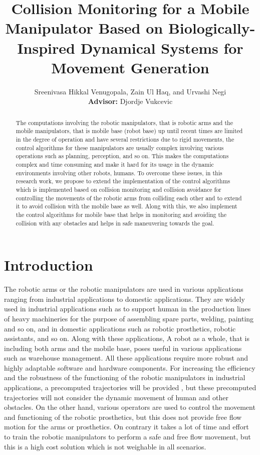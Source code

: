 \documentclass[a4paper, 11.5pt, conference]{ieeeconf}      %
\title{\LARGE \bf Collision Monitoring for a Mobile Manipulator Based on Biologically-Inspired Dynamical Systems for Movement Generation}
\author{Sreenivasa Hikkal Venugopala, Zain Ul Haq, and Urvashi Negi \\ {\small \textbf{Advisor:} Djordje Vukcevic}}
\begin{document}
\maketitle
\thispagestyle{empty}
\pagestyle{empty}


\begin{abstract}
The computations involving the robotic manipulators, that is robotic arms and the mobile manipulators, that is mobile base (robot base) up until recent times are limited in the degree of operation and have several restrictions due to rigid movements, the control algorithms for these manipulators are usually complex involving various operations such as planning, perception, and so on. This makes the computations complex and time consuming and make it hard for its usage in the dynamic environments involving other robots, humans. To overcome these issues, in this research work, we propose to extend the implementation of the control algorithms which is implemented based on collision monitoring \cite{Khatib} and collision avoidance \cite{Hoffmann} for controlling the movements of the robotic arms from colliding each other and to extend it to avoid collision with the mobile base as well. Along with this, we also implement the control algorithms for mobile base that helps in monitoring and avoiding the collision with any obstacles and helps in safe maneuvering towards the goal.

\end{abstract}


\section{Introduction} 

The robotic arms or the robotic manipulators are used in various applications ranging from industrial applications to domestic applications. They are widely used in industrial applications such as to support human in the production lines of heavy machineries for the purpose of assembling spare parts, welding, painting and so on, and in domestic applications such as robotic prosthetics, robotic assistants, and so on. Along with these applications, A robot as a whole, that is including both arms and the mobile base, poses useful in various applications such as warehouse management. All these applications require more robust and highly adaptable software and hardware components. For increasing the efficiency and the robustness of the functioning of the robotic manipulators in industrial applications, a precomputed trajectories will be provided \cite{Hoffmann}, but these precomputed trajectories will not consider the dynamic movement of human and other obstacles. On the other hand, various operators are used to control the movement and functioning of the robotic prosthetics, but this does not provide free flow motion for the arms or prosthetics. On contrary it takes a lot of time and effort to train the robotic manipulators to perform a safe and free flow movement, but this is a high cost solution which is not weighable in all scenarios.
\end{document}
